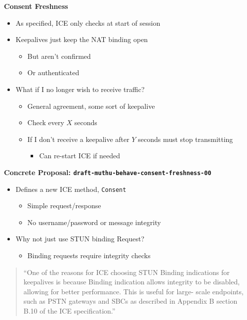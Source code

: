 \documentclass[helvetica]{seminar}
\newcommand{\heading}[1]{%
  \begin{center} 
    \large\bf 
    #1 
  \end{center} 
  \vspace{.4 in}}
\begin{document}
\begin{slide}
\heading{Consent Freshness}

\begin{itemize}
\item As specified, ICE only checks at start of session
\item Keepalives just keep the NAT binding open
  \begin{itemize}
  \item But aren't confirmed
  \item Or authenticated
  \end{itemize}

\item What if I no longer wish to receive traffic?
  \begin{itemize}
  \item General agreement, some sort of keepalive
  \item Check every $X$ seconds
  \item If I don't receive a keepalive after $Y$ seconds must stop transmitting
    \begin{itemize}
    \item Can re-start ICE if needed
    \end{itemize}
  \end{itemize}
\end{itemize}

\end{slide}



\begin{slide}
\heading{Concrete Proposal: \texttt{draft-muthu-behave-consent-freshness-00}}

\vspace{-.25in}
\begin{itemize}
\item Defines a new ICE method, \verb^Consent^
  \begin{itemize}
  \item Simple request/response
  \item No username/password or message integrity
  \end{itemize}

\item Why not just use STUN binding Request?
  \begin{itemize}
  \item Binding requests require integrity checks
  \end{itemize}
\end{itemize}

\begin{quote}
``One of the reasons for ICE choosing STUN Binding indications for
keepalives is because Binding indication allows integrity to be
disabled, allowing for better performance.  This is useful for large-
scale endpoints, such as PSTN gateways and SBCs as described in
Appendix B section B.10 of the ICE specification.''
\end{quote}

\end{slide}
\end{document}
